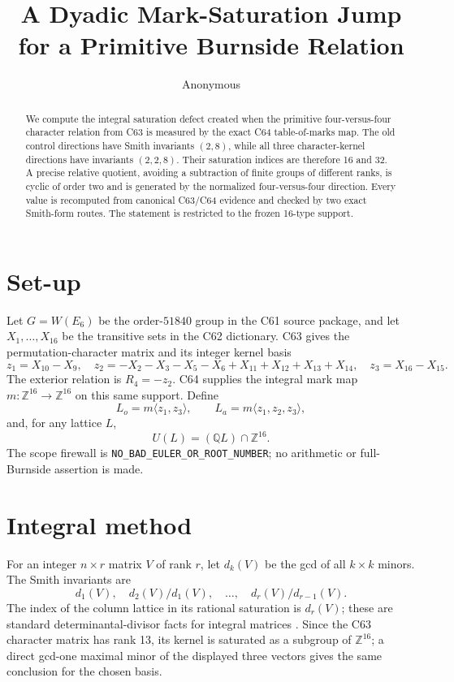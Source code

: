 \documentclass[10pt]{article}
\title{A Dyadic Mark-Saturation Jump for a Primitive Burnside Relation}
\author{Anonymous}
\date{}
\newcommand{\Z}{\mathbb Z}
\newcommand{\W}{W(E_6)}
\begin{document}
\maketitle

\begin{abstract}
We compute the integral saturation defect created when the primitive
four-versus-four character relation from C63 is measured by the exact C64
table-of-marks map.  The old control directions have Smith invariants
$(2,8)$, while all three character-kernel directions have invariants
$(2,2,8)$.  Their saturation indices are therefore 16 and 32.  A precise
relative quotient, avoiding a subtraction of finite groups of different
ranks, is cyclic of order two and is generated by the normalized
four-versus-four direction.  Every value is recomputed from canonical C63/C64
evidence and checked by two exact Smith-form routes.  The statement is
restricted to the frozen 16-type support.
\end{abstract}

\section{Set-up}
Let $G=\W$ be the order-$51840$ group in the C61 source package, and let
$X_1,\ldots,X_{16}$ be the transitive sets in the C62 dictionary.  C63 gives
the permutation-character matrix and its integer kernel basis
\[
 z_1=X_{10}-X_9,\quad
 z_2=-X_2-X_3-X_5-X_6+X_{11}+X_{12}+X_{13}+X_{14},\quad
 z_3=X_{16}-X_{15}.
\]
The exterior relation is $R_4=-z_2$.  C64 supplies the integral mark map
\(m:\Z^{16}\to\Z^{16}\) on this same support.  Define
\[
 L_o=m\langle z_1,z_3\rangle,\qquad
 L_a=m\langle z_1,z_2,z_3\rangle,
\]
and, for any lattice $L$,
\[
 U(L)=(\mathbb QL)\cap\mathbb Z^{16}.
\]
The scope firewall is \texttt{NO\_BAD\_EULER\_OR\_ROOT\_NUMBER}; no
arithmetic or full-Burnside assertion is made.

\section{Integral method}
For an integer $n\times r$ matrix $V$ of rank $r$, let $d_k(V)$ be the gcd of
all $k\times k$ minors.  The Smith invariants are
\[
 d_1(V),\quad d_2(V)/d_1(V),\quad\ldots,\quad d_r(V)/d_{r-1}(V).
\]
The index of the column lattice in its rational saturation is $d_r(V)$;
these are standard determinantal-divisor facts for integral matrices
\cite{newman1972integral,cohen1993computational}.  Since the C63 character
matrix has rank 13, its kernel is saturated as a subgroup of $\Z^{16}$; a
direct gcd-one maximal minor of the displayed three vectors gives the same
conclusion for the chosen basis.
\end{document}
